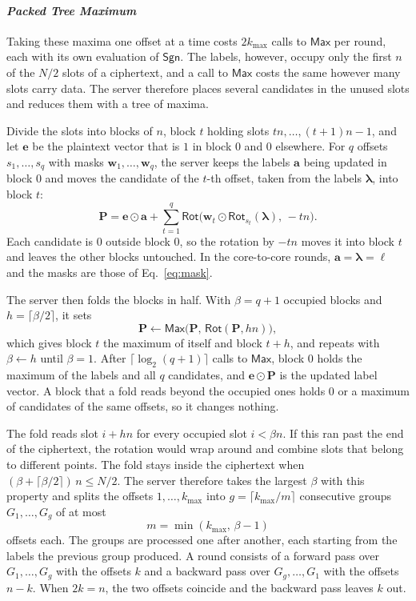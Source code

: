 \paragraph{\emph{Packed Tree Maximum}}
Taking these maxima one offset at a time costs $2k_{\max}$ calls to
$\mathsf{Max}$ per round, each with its own evaluation of $\mathsf{Sgn}$.
The labels, however, occupy only the first $n$ of the $N/2$ slots of a
ciphertext, and a call to $\mathsf{Max}$ costs the same however many
slots carry data. The server therefore places several candidates in the
unused slots and reduces them with a tree of maxima.

Divide the slots into blocks of $n$, block $t$ holding slots
$tn, \dots, (t+1)n - 1$, and let $\mathbf{e}$ be the plaintext vector that
is $1$ in block $0$ and $0$ elsewhere. For $q$ offsets
$s_1, \dots, s_q$ with masks $\mathbf{w}_1, \dots, \mathbf{w}_q$, the
server keeps the labels $\mathbf{a}$ being updated in block $0$ and moves
the candidate of the $t$-th offset, taken from the labels
$\boldsymbol{\lambda}$, into block $t$:
\begin{equation}
  \label{eq:pack}
  \mathbf{P} = \mathbf{e} \odot \mathbf{a} + \sum_{t=1}^{q}
    \mathsf{Rot}\bigl( \mathbf{w}_t \odot
      \mathsf{Rot}_{s_t}(\boldsymbol{\lambda}),\, -tn \bigr).
\end{equation}
Each candidate is $0$ outside block $0$, so the rotation by $-tn$ moves
it into block $t$ and leaves the other blocks untouched. In the
core-to-core rounds, $\mathbf{a} = \boldsymbol{\lambda} = \boldsymbol{\ell}$
and the masks are those of Eq.~\eqref{eq:mask}.

The server then folds the blocks in half. With $\beta = q+1$ occupied
blocks and $h = \lceil \beta/2 \rceil$, it sets
\[
  \mathbf{P} \gets \mathsf{Max}\bigl( \mathbf{P},\,
    \mathsf{Rot}(\mathbf{P}, hn) \bigr),
\]
which gives block $t$ the maximum of itself and block $t+h$, and repeats
with $\beta \gets h$ until $\beta = 1$. After $\lceil \log_2(q+1) \rceil$ calls to
$\mathsf{Max}$, block $0$ holds the maximum of the labels and all $q$
candidates, and $\mathbf{e} \odot \mathbf{P}$ is the updated label vector.
A block that a fold reads beyond the occupied ones holds $0$ or a maximum
of candidates of the same offsets, so it changes nothing.

The fold reads slot $i + hn$ for every occupied slot $i < \beta n$. If this
ran past the end of the ciphertext, the rotation would wrap around and
combine slots that belong to different points. The fold stays inside the
ciphertext when $(\beta + \lceil \beta/2 \rceil)\, n \le N/2$. The server
therefore takes the largest $\beta$ with this property and splits the offsets
$1, \dots, k_{\max}$ into $g = \lceil k_{\max}/m \rceil$ consecutive groups
$G_1, \dots, G_g$ of at most
\[
  m = \min(k_{\max},\, \beta - 1)
\]
offsets each. The groups are processed one after another, each starting
from the labels the previous group produced. A round consists of a forward
pass over $G_1, \dots, G_g$ with the offsets $k$ and a backward pass over
$G_g, \dots, G_1$ with the offsets $n-k$. When $2k = n$, the two offsets
coincide and the backward pass leaves $k$ out.

